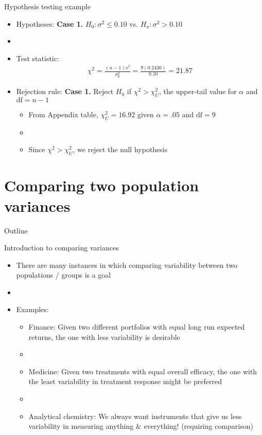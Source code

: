 \documentclass[xcolor=dvipsnames]{beamer}
\begin{document}
\begin{frame}{Hypothesis testing example}
	\begin{itemize}
		\item Hypotheses: \textbf{Case 1.} $H_0: \sigma^2 \leq 0.10$ vs. $H_a: \sigma^2 > 0.10$
		\item[]
		\item Test statistic:
		\begin{gather*}
		\chi^2 = \frac{(n-1)s^2}{\sigma_0^2} = \frac{9 (0.2430)}{0.10} =  21.87
		\end{gather*}
		\item Rejection rule: \textbf{Case 1.} Reject $H_0$ if $\chi^2 > \chi_U^2$, the upper-tail value for $\alpha$ and $\text{df} = n-1$ \pause
		\begin{itemize}
			\item From Appendix table, $\chi^2_U = 16.92$ given $\alpha = .05$ and $\text{df} = 9$ \pause
			\item[]
			\item Since $\chi^2 > \chi^2_U$, we reject the null hypothesis
		\end{itemize}
	\end{itemize}
\end{frame}

\section{Comparing two population variances}
\begin{frame}{Outline}
	\tableofcontents[currentsection,subsectionstyle=show/shaded/hide]
\end{frame}

\begin{frame}{Introduction to comparing variances}
	\begin{itemize}
		\item There are many instances in which comparing variability between two populations / groups is a goal \pause
	\item[]
	\item Examples:
	\begin{itemize}
		\item Finance: Given two different portfolios with equal long run expected returns, the one with less variability is desirable \pause
		\item[]
		\item Medicine: Given two treatments with equal overall efficacy, the one with the least variability in treatment response might be preferred \pause
		\item[]
		\item Analytical chemistry: We always want instruments that give us less variability in measuring anything \& everything! (requiring comparison)
	\end{itemize}
	\end{itemize}
\end{frame}
\end{document}
